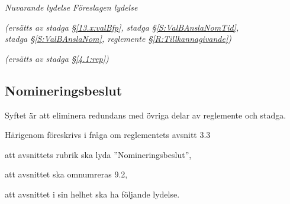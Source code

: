 \documentclass{article}
\newenvironment{lydelse}
    {\begin{paracol}{2}%
        \emph{Nuvarande lydelse}%
        \switchcolumn%
        \emph{Föreslagen lydelse}%
    \end{paracol}%
    \begin{enumerate}[label=\thesubsection.\arabic*]%
    \begin{paracol}{2}%
    }{\end{paracol}\end{enumerate}}
\begin{document}
\begin{lydelse}
    \item[] \emph{(ersätts av stadga \S \ref{13.x:valBfp}, stadga \S \ref{S:ValBAnslaNomTid}, \\
    stadga \S \ref{S:ValBAnslaNom}, reglemente \S \ref{R:Tillkannagivande})}
    
    \vspace{14ex}
    \item[] \emph{(ersätts av stadga \S \ref{4.1:rep})}
\end{lydelse}


\setcounter{subsection}{1}
\subsection{Nomineringsbeslut}
Syftet är att eliminera redundans med övriga delar av reglemente och stadga. 

Härigenom föreskrivs i fråga om reglementets avsnitt 3.3

\begin{dels}
    \item att avsnittets rubrik ska lyda ''Nomineringsbeslut'',
    \item att avsnittet ska omnumreras 9.2,
    \item att avsnittet i sin helhet ska ha följande lydelse.
\end{dels}
\end{document}
